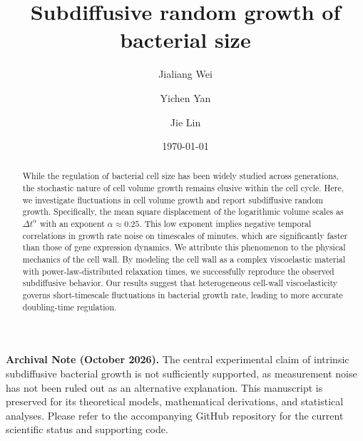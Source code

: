 \documentclass[aps, prl, twocolumn, longbibliography, linenumbers, superscriptaddress]{revtex4-2}
\begin{document}
\title{Subdiffusive random growth of bacterial size}

\author{Jialiang Wei}
\author{Yichen Yan}
\author{Jie Lin}
\date{\today}
\begin{abstract}
While the regulation of bacterial cell size has been widely studied across generations, the stochastic nature of cell volume growth remains elusive within the cell cycle. Here, we investigate fluctuations in cell volume growth and report subdiffusive random growth. Specifically, the mean square displacement of the logarithmic volume scales as $\Delta t^\alpha$ with an exponent $\alpha \approx 0.25$. This low exponent implies negative temporal correlations in growth rate noise on timescales of minutes, which are significantly faster than those of gene expression dynamics. We attribute this phenomenon to the physical mechanics of the cell wall. By modeling the cell wall as a complex viscoelastic material with power-law-distributed relaxation times, we successfully reproduce the observed subdiffusive behavior. Our results suggest that heterogeneous cell-wall viscoelasticity governs short-timescale fluctuations in bacterial growth rate, leading to more accurate doubling-time regulation.
\end{abstract}
\maketitle

\noindent
{\small
\textbf{Archival Note (October 2026).}
The central experimental claim of intrinsic subdiffusive
bacterial growth is not sufficiently supported, as
measurement noise has not been ruled out as an alternative
explanation. This manuscript is preserved for its theoretical
models, mathematical derivations, and statistical analyses.
Please refer to the accompanying GitHub repository for
the current scientific status and supporting code.
}
\par\vspace{0.8em}
\end{document}
